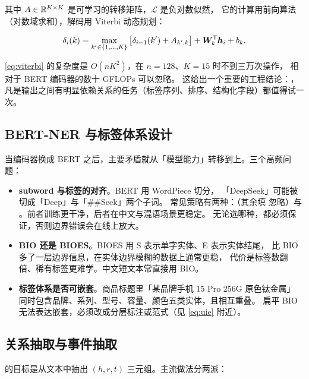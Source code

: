 其中 $A \in \mathbb{R}^{K \times K}$ 是可学习的转移矩阵，$\mathcal{L}$ 是负对数似然，
它的计算用前向算法（对数域求和），解码用 Viterbi 动态规划：

\begin{equation}
\delta_i(k) = \max_{k' \in \{1,\dots,K\}} \big[ \delta_{i-1}(k') + A_{k',k} \big] + \bm{W}_k^{\mathsf{T}} \bm{h}_i + b_k .
\label{eq:viterbi}
\end{equation}

\cref{eq:viterbi} 的复杂度是 $O(nK^2)$，在 $n=128$、$K=15$ 时不到三万次操作，
相对于 BERT 编码器的数十 GFLOPs 可以忽略。
这给出一个重要的工程结论：，
凡是输出之间有明显依赖关系的任务（标签序列、排序、结构化字段）都值得试一次。

\subsection{BERT-NER 与标签体系设计}

当编码器换成 BERT 之后，主要矛盾就从「模型能力」转移到上。三个高频问题：

\begin{itemize}
  \item \textbf{subword 与标签的对齐}。BERT 用 WordPiece 切分，
        「DeepSeek」可能被切成「Deep」与「\#\#Seek」两个子词。
        常见策略有两种：（其余填  忽略）与
        。前者训练更干净，后者在中文与混语场景更稳定。
        无论选哪种，都必须保证，否则边界错误会在线上放大。
  \item \textbf{BIO 还是 BIOES}。BIOES 用 S 表示单字实体、E 表示实体结尾，
        比 BIO 多了一层边界信息，在实体边界模糊的数据上通常更稳，
        代价是标签数翻倍、稀有标签更难学。中文短文本常直接用 BIO。
  \item \textbf{标签体系是否可嵌套}。商品标题里「某品牌手机 15 Pro 256G 原色钛金属」
        同时包含品牌、系列、型号、容量、颜色五类实体，且相互重叠。
        扁平 BIO 无法表达嵌套，必须改成分层标注或范式（见 \cref{eq:uie} 附近）。
\end{itemize}

\subsection{关系抽取与事件抽取}

 的目标是从文本中抽出
$(h, r, t)$ 三元组。主流做法分两派：

